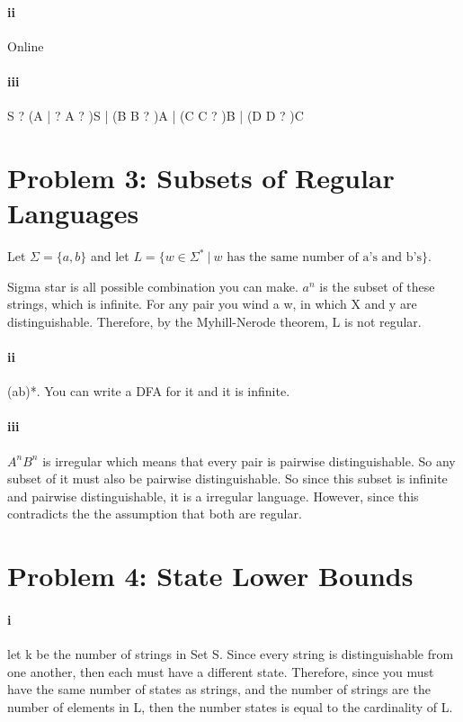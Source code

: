 \documentclass[10pt,letter]{article}
\begin{document}
\paragraph{ii}
Online

\paragraph{iii}
S ? (A | ?
A ? )S | (B
B ? )A | (C
C ? )B | (D
D ? )C

\section*{Problem 3: Subsets of Regular Languages}
Let $\Sigma = \{a, b\}$ and let $L = \{ w \in \Sigma^* \ | \ w \text{ has the same number of a's and b's} \}$. 

\proof Sigma star is all possible combination you can make. $a^n$ is the subset of these strings, which is infinite. For any pair you wind a w, in which  X and y are distinguishable. Therefore, by the Myhill-Nerode theorem, L is not regular. 

\paragraph{ii}
(ab)*. You can write a DFA for it and it is infinite. 

\paragraph{iii}
$A^nB^n$ is irregular which means that every pair is pairwise distinguishable. So any subset of it must also be pairwise distinguishable. So since this subset is infinite and pairwise distinguishable, it is a irregular language. However, since this contradicts the the assumption that both are regular. 

\section*{Problem 4: State Lower Bounds}
\paragraph{i}
let k be the number of strings in Set S. Since every string is distinguishable from one another, then each must have a different state. Therefore, since you must have the same number of states as strings, and the number of strings are the number of elements in L, then the number states is equal to the cardinality of L. 
\end{document}
